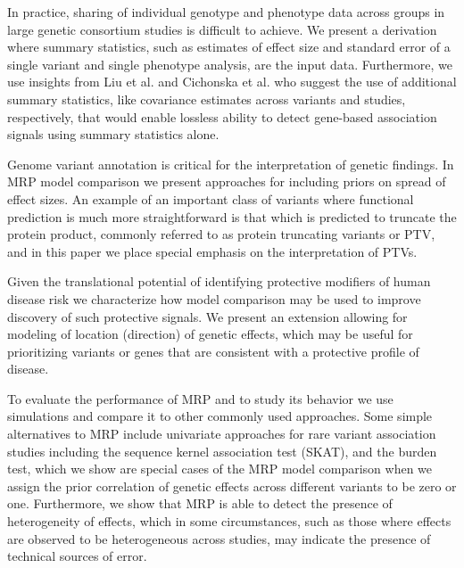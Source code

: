 \documentclass{nature}
\begin{document}
In practice, sharing of individual genotype and phenotype data across groups in large genetic consortium studies is difficult to achieve.  We present a derivation where summary statistics, such as estimates of effect size and standard error of a single variant and single phenotype analysis, are the input data. Furthermore, we use insights from Liu et al.\cite{liu2014meta} and Cichonska et al.\cite{cichonska2016metacca} who suggest the use of additional summary statistics, like covariance estimates across variants and studies, respectively, that would enable lossless ability to detect gene-based association signals using summary statistics alone.  

Genome variant annotation is critical for the interpretation of genetic findings. In MRP model comparison we present approaches for including priors on spread of effect sizes. An example of an important class of variants where functional prediction is much more straightforward is that which is predicted to truncate the protein product, commonly referred to as protein truncating variants or PTV\cite{rivas2013assessing,rivas2015effect}, and in this paper we place special emphasis on the interpretation of PTVs. 

Given the translational potential of identifying protective modifiers of human disease risk we characterize how model comparison may be used to improve discovery of such protective signals. We present an extension allowing for modeling of location (direction) of genetic effects, which may be useful for prioritizing variants or genes that are consistent with a protective profile of disease\cite{pcsk9,cohen2006sequence,sullivan2012effect}. 

To evaluate the performance of MRP and to study its behavior we use simulations and compare it to other commonly used approaches. Some simple alternatives to MRP include univariate approaches for rare variant association studies including the sequence kernel association test (SKAT)\cite{skat}, and the burden test, which we show are special cases of the MRP model comparison when we assign the prior correlation of genetic effects across different variants to be zero or one. Furthermore, we show that MRP is able to detect the presence of heterogeneity of effects, which in some circumstances, such as those where effects are observed to be heterogeneous across studies, may indicate the presence of technical sources of error. 
  
\end{document}
